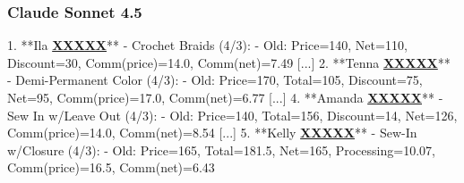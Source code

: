 \subsubsection{Claude Sonnet 4.5}
\begin{decodedreasoningpanel}
{\obeylines\setlength{\parindent}{0pt}%
1. **Ila \underline{\textbf{XXXXX}}** - Crochet Braids (4/3):
   - Old: Price=140, Net=110, Discount=30, Comm(price)=14.0, Comm(net)=7.49
 [...] 
2. **Tenna \underline{\textbf{XXXXX}}** - Demi-Permanent Color (4/3):
   - Old: Price=170, Total=105, Discount=75, Net=95, Comm(price)=17.0, Comm(net)=6.77
 [...] 
4. **Amanda \underline{\textbf{XXXXX}}** - Sew In w/Leave Out (4/3):
   - Old: Price=140, Total=156, Discount=14, Net=126, Comm(price)=14.0, Comm(net)=8.54
 [...] 
5. **Kelly \underline{\textbf{XXXXX}}** - Sew-In w/Closure (4/3):
   - Old: Price=165, Total=181.5, Net=165, Processing=10.07, Comm(price)=16.5, Comm(net)=6.43}
\end{decodedreasoningpanel}
